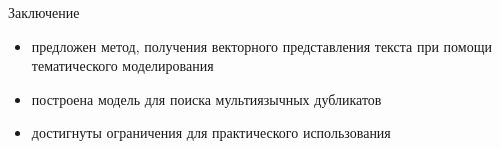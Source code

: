 \documentclass{beamer}
\begin{document}

\begin{frame}{Заключение}
    \begin{itemize}
        \item предложен метод, получения векторного представления текста при помощи тематического моделирования
        \item построена модель для поиска мультиязычных дубликатов
        \item достигнуты ограничения для практического использования
    \end{itemize}
\end{frame}


\end{document}
